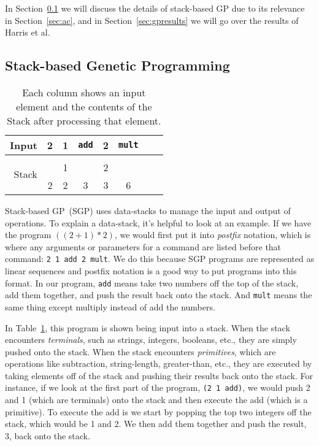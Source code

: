 \documentclass{sig-alternate}
\begin{document}
In Section~\ref{sec:sgp} we will discuss the details of stack-based GP due to its relevance in Section~\ref{sec:ac}, and in Section~\ref{sec:gpresults} we will go over the results of Harris et al.

\subsection{Stack-based Genetic Programming}
\label{sec:sgp}
\begin{table}
	\centering
	\begin{tabular}{|r|c|c|c|c|c|c|c|}
		\hline
		Input & 2 & 1 & \texttt{add} & 2 & \texttt{mult} \\
		\hline
		\multirow{3}{*}{Stack} & & & & &\\
		&   & 1 &   & 2 &   \\
		& 2 & 2 & 3 & 3 & 6 \\
		\hline
	\end{tabular}
	\caption{Each column shows an input element and the contents of the Stack after processing that element.}
	\label{tab:stacks}
\end{table}

Stack-based GP~(SGP) uses data-stacks to manage the input and output of operations. To explain a data-stack, it's helpful to look at an example. If we have the program $((2+1)*2)$, we would first put it into \textit{postfix} notation, which is where any arguments or parameters for a command are listed before that command: \texttt{2~1~add~2~mult}. We do this because SGP programs are represented as linear sequences and postfix notation is a good way to put programs into this format. In our program, \texttt{add} means take two numbers off the top of the stack, add them together, and push the result back onto the stack. And \texttt{mult} means the same thing except multiply instead of add the numbers.

In Table~\ref{tab:stacks}, this program is shown being input into a stack. When the stack encounters \textit{terminals}, such as strings, integers, booleans, etc., they are simply pushed onto the stack. When the stack encounters \textit{primitives}, which are operations like subtraction, string-length, greater-than, etc., they are executed by taking elements off of the stack and pushing their results back onto the stack. For instance, if we look at the first part of the program, \texttt{(2~1~add)}, we would push 2 and 1 (which are terminals) onto the stack and then execute the add (which is a primitive). To execute the add is we start by popping the top  two integers off the stack, which would be 1 and 2. We then add them together and push the result, 3, back onto the stack.
\end{document}

